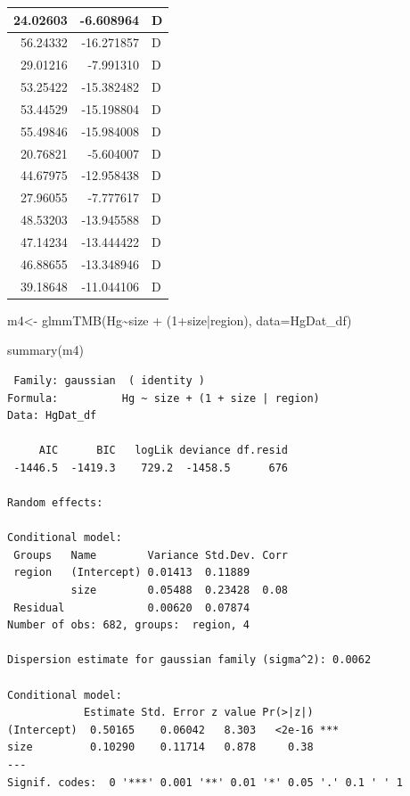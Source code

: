 \documentclass[
  letterpaper,
  DIV=11,
  numbers=noendperiod]{scrartcl}
\newenvironment{Shaded}{\begin{snugshade}}{\end{snugshade}}
\newcommand{\AttributeTok}[1]{\textcolor[rgb]{0.40,0.45,0.13}{#1}}
\newcommand{\DecValTok}[1]{\textcolor[rgb]{0.68,0.00,0.00}{#1}}
\newcommand{\FunctionTok}[1]{\textcolor[rgb]{0.28,0.35,0.67}{#1}}
\newcommand{\NormalTok}[1]{\textcolor[rgb]{0.00,0.23,0.31}{#1}}
\newcommand{\OtherTok}[1]{\textcolor[rgb]{0.00,0.23,0.31}{#1}}
\newcommand{\SpecialCharTok}[1]{\textcolor[rgb]{0.37,0.37,0.37}{#1}}
\begin{document}
\begin{table}
\begin{tabular}[t]{r|r|l}
\hline
24.02603 & -6.608964 & D\\
\hline
56.24332 & -16.271857 & D\\
\hline
29.01216 & -7.991310 & D\\
\hline
53.25422 & -15.382482 & D\\
\hline
53.44529 & -15.198804 & D\\
\hline
55.49846 & -15.984008 & D\\
\hline
20.76821 & -5.604007 & D\\
\hline
44.67975 & -12.958438 & D\\
\hline
27.96055 & -7.777617 & D\\
\hline
48.53203 & -13.945588 & D\\
\hline
47.14234 & -13.444422 & D\\
\hline
46.88655 & -13.348946 & D\\
\hline
39.18648 & -11.044106 & D\\
\hline
\end{tabular}
\end{table}

\begin{Shaded}
\begin{Highlighting}[]
\NormalTok{m4}\OtherTok{\textless{}{-}} \FunctionTok{glmmTMB}\NormalTok{(Hg}\SpecialCharTok{\textasciitilde{}}\NormalTok{size }\SpecialCharTok{+}\NormalTok{ (}\DecValTok{1}\SpecialCharTok{+}\NormalTok{size}\SpecialCharTok{|}\NormalTok{region), }\AttributeTok{data=}\NormalTok{HgDat\_df)}

\FunctionTok{summary}\NormalTok{(m4)}
\end{Highlighting}
\end{Shaded}

\begin{verbatim}
 Family: gaussian  ( identity )
Formula:          Hg ~ size + (1 + size | region)
Data: HgDat_df

     AIC      BIC   logLik deviance df.resid 
 -1446.5  -1419.3    729.2  -1458.5      676 

Random effects:

Conditional model:
 Groups   Name        Variance Std.Dev. Corr 
 region   (Intercept) 0.01413  0.11889       
          size        0.05488  0.23428  0.08 
 Residual             0.00620  0.07874       
Number of obs: 682, groups:  region, 4

Dispersion estimate for gaussian family (sigma^2): 0.0062 

Conditional model:
            Estimate Std. Error z value Pr(>|z|)    
(Intercept)  0.50165    0.06042   8.303   <2e-16 ***
size         0.10290    0.11714   0.878     0.38    
---
Signif. codes:  0 '***' 0.001 '**' 0.01 '*' 0.05 '.' 0.1 ' ' 1
\end{verbatim}
\end{document}
